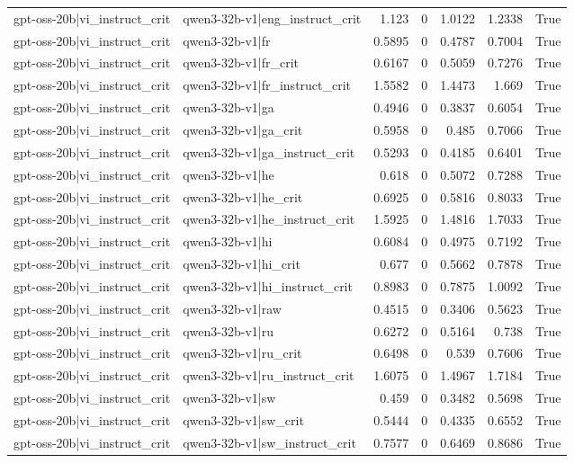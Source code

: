 \begin{table}
\begin{tabular}{l l r r r r l}
gpt-oss-20b|vi_instruct_crit & qwen3-32b-v1|eng_instruct_crit & 1.123 & 0 & 1.0122 & 1.2338 & True \\
gpt-oss-20b|vi_instruct_crit & qwen3-32b-v1|fr & 0.5895 & 0 & 0.4787 & 0.7004 & True \\
gpt-oss-20b|vi_instruct_crit & qwen3-32b-v1|fr_crit & 0.6167 & 0 & 0.5059 & 0.7276 & True \\
gpt-oss-20b|vi_instruct_crit & qwen3-32b-v1|fr_instruct_crit & 1.5582 & 0 & 1.4473 & 1.669 & True \\
gpt-oss-20b|vi_instruct_crit & qwen3-32b-v1|ga & 0.4946 & 0 & 0.3837 & 0.6054 & True \\
gpt-oss-20b|vi_instruct_crit & qwen3-32b-v1|ga_crit & 0.5958 & 0 & 0.485 & 0.7066 & True \\
gpt-oss-20b|vi_instruct_crit & qwen3-32b-v1|ga_instruct_crit & 0.5293 & 0 & 0.4185 & 0.6401 & True \\
gpt-oss-20b|vi_instruct_crit & qwen3-32b-v1|he & 0.618 & 0 & 0.5072 & 0.7288 & True \\
gpt-oss-20b|vi_instruct_crit & qwen3-32b-v1|he_crit & 0.6925 & 0 & 0.5816 & 0.8033 & True \\
gpt-oss-20b|vi_instruct_crit & qwen3-32b-v1|he_instruct_crit & 1.5925 & 0 & 1.4816 & 1.7033 & True \\
gpt-oss-20b|vi_instruct_crit & qwen3-32b-v1|hi & 0.6084 & 0 & 0.4975 & 0.7192 & True \\
gpt-oss-20b|vi_instruct_crit & qwen3-32b-v1|hi_crit & 0.677 & 0 & 0.5662 & 0.7878 & True \\
gpt-oss-20b|vi_instruct_crit & qwen3-32b-v1|hi_instruct_crit & 0.8983 & 0 & 0.7875 & 1.0092 & True \\
gpt-oss-20b|vi_instruct_crit & qwen3-32b-v1|raw & 0.4515 & 0 & 0.3406 & 0.5623 & True \\
gpt-oss-20b|vi_instruct_crit & qwen3-32b-v1|ru & 0.6272 & 0 & 0.5164 & 0.738 & True \\
gpt-oss-20b|vi_instruct_crit & qwen3-32b-v1|ru_crit & 0.6498 & 0 & 0.539 & 0.7606 & True \\
gpt-oss-20b|vi_instruct_crit & qwen3-32b-v1|ru_instruct_crit & 1.6075 & 0 & 1.4967 & 1.7184 & True \\
gpt-oss-20b|vi_instruct_crit & qwen3-32b-v1|sw & 0.459 & 0 & 0.3482 & 0.5698 & True \\
gpt-oss-20b|vi_instruct_crit & qwen3-32b-v1|sw_crit & 0.5444 & 0 & 0.4335 & 0.6552 & True \\
gpt-oss-20b|vi_instruct_crit & qwen3-32b-v1|sw_instruct_crit & 0.7577 & 0 & 0.6469 & 0.8686 & True \\

\end{tabular}
\end{table}
